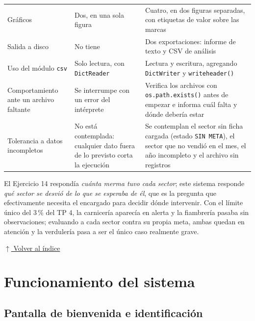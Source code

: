 \documentclass[12pt]{article}
\newcommand{\codigo}[1]{\texttt{\small #1}}
\newcommand{\volverindice}{%
    \vspace{1em}%
    \begin{flushright}%
        \hyperlink{indice}{\small $\uparrow$ Volver al índice}%
    \end{flushright}%
}
\begin{document}
\begin{center}
\begin{longtable}{p{4.2cm} p{4.6cm} p{5.2cm}}
    Gráficos & Dos, en una sola figura & Cuatro, en dos figuras separadas, con etiquetas de valor sobre las marcas \\
    \addlinespace

    Salida a disco & No tiene & Dos exportaciones: informe de texto y CSV de análisis \\
    \addlinespace

    Uso del módulo \codigo{csv} & Solo lectura, con \codigo{DictReader} & Lectura y escritura, agregando \codigo{DictWriter} y \codigo{writeheader()} \\
    \addlinespace

    Comportamiento ante un archivo faltante & Se interrumpe con un error del intérprete & Verifica los archivos con \codigo{os.path.exists()} antes de empezar e informa cuál falta y dónde debería estar \\
    \addlinespace

    Tolerancia a datos incompletos & No está contemplada: cualquier dato fuera de lo previsto corta la ejecución & Se contemplan el sector sin ficha cargada (estado \codigo{SIN META}), el sector que no vendió en el mes, el año incompleto y el archivo sin registros \\

    \bottomrule
\end{longtable}
\end{center}

El Ejercicio 14 respondía \emph{cuánta merma tuvo cada sector}; este sistema responde \emph{qué sector se desvió de lo que se esperaba de él}, que es la pregunta que efectivamente necesita el encargado para decidir dónde intervenir. Con el límite único del 3\,\% del TP 4, la carnicería aparecía en alerta y la fiambrería pasaba sin observaciones; evaluando a cada sector contra su propia meta, ambas quedan en atención y la verdulería pasa a ser el único caso realmente grave.

\volverindice

\newpage

\section{Funcionamiento del sistema}

\subsection{Pantalla de bienvenida e identificación}
\end{document}
